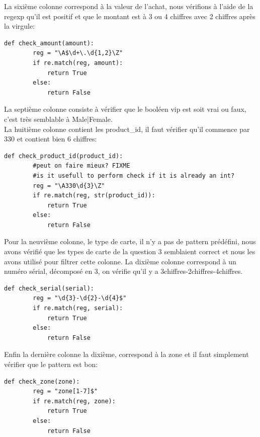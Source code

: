 \documentclass[11pt]{article}
\begin{document}
	La sixième colonne correspond à la valeur de l'achat, nous vérifions
	à l'aide de la regexp qu'il est positif et que le montant est à
	3 ou 4 chiffres avec 2 chiffres après la virgule:
	\begin{lstlisting}[style=myPython]
	def check_amount(amount):
		reg = "\A$\d+\.\d{1,2}\Z"
		if re.match(reg, amount):
			return True
		else:
			return False
	\end{lstlisting}
	La septième colonne consiste à vérifier que le booléen vip est soit
	vrai ou faux, c'est très semblable à Male|Female. \\
	La huitième colonne contient les product\_id, il faut vérifier qu'il
	commence par 330 et contient bien 6 chiffres:
	\begin{lstlisting}[style=myPython]
	def check_product_id(product_id):
		#peut on faire mieux? FIXME
		#is it usefull to perform check if it is already an int?
		reg = "\A330\d{3}\Z"
		if re.match(reg, str(product_id)):
			return True
		else:
			return False
	\end{lstlisting}
	Pour la neuvième colonne, le type de carte, il n'y a pas de pattern
	prédéfini, nous avons vérifié que les types de carte de la question
	3 semblaient correct et nous les avons utilisé pour filtrer
	cette colonne.
	La dixième colonne correspond à un numéro sérial, décomposé en 3,
	on vérifie qu'il y a 3chiffres-2chiffres-4chiffres.
	\begin{lstlisting}[style=myPython]
	def check_serial(serial):
		reg = "\d{3}-\d{2}-\d{4}$"
		if re.match(reg, serial):
			return True
		else:
			return False
	\end{lstlisting}
	Enfin la dernière colonne la dixième, correspond à la zone et il faut
	simplement vérifier que le pattern est bon:
	\begin{lstlisting}[style=myPython]
	def check_zone(zone):
		reg = "zone[1-7]$"
		if re.match(reg, zone):
			return True
		else:
			return False
	\end{lstlisting}
\end{document}
